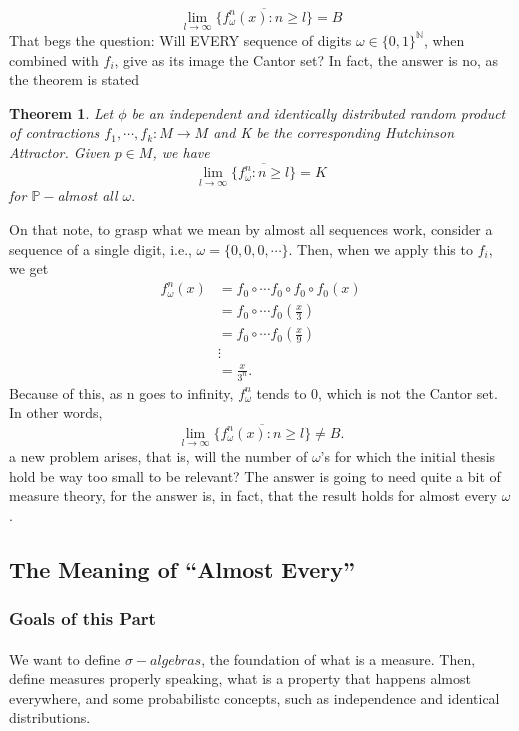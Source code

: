 \documentclass{article}
\newtheorem*{theo*}{Theorem}
\begin{document}
  $$
  \lim_{l\to\infty}\overline{\{f_{\omega}^{n}(x):n\geq{l}\}} = B
  $$
  That begs the question: Will EVERY sequence of digits $\omega\in\{0, 1\}^{\mathbb{N}}$, when combined with $f_{i}$, give 
as its image the Cantor set? In fact, the answer is no, as the theorem is stated
 \begin{theo*}
   Let $\phi$ be an independent and identically distributed random product of contractions $f_{1},\cdots, f_{k}:M\rightarrow M$ and
  K be the corresponding Hutchinson Attractor. Given $p\in M$, we have
    $$
    \lim_{l\to\infty}\overline{\{f_{\omega}^{n}:n\geq{l}\}} = K
    $$
    for $\mathbb{P}-$almost all $\omega.$
 \end{theo*}
On that note, to grasp what we mean by almost all sequences work, consider a sequence of a single digit, i.e., $\omega =\{0, 0, 0, \cdots\} $. Then, when we apply this to $f_{i}$, we get
  \begin{align*}
    f_{\omega}^{n}(x) &= f_{0}\circ{\cdots}f_{0}\circ{f_{0}}\circ{f_{0}}(x)\\
                      &= f_{0}\circ{\cdots}f_{0}(\frac{x}{3}) \\
                      &= f_{0}\circ{\cdots}f_{0}(\frac{x}{9}) \\
                      &\vdots\\
                      &= \frac{x}{3^{n}}.
  \end{align*}
  Because of this, as n goes to infinity, $f_{\omega}^{n}$ tends to 0, which is not the Cantor set. In other words,
  $$
    \lim_{l\to\infty}\overline{\{f_{\omega}^{n}(x):n\geq{l}\}}\neq B.
  $$
  a new problem arises, that is, will the number of $\omega$'s for which the initial thesis hold be way too small to be relevant? The answer is going to need
quite a bit of measure theory, for the answer is, in fact, that the result holds for almost every $\omega$.

\subsection{The Meaning of ``Almost Every''}
  \subsubsection{Goals of this Part}
  \paragraph{} We want to define $\sigma-algebras$, the foundation of what is a measure. Then, define measures properly speaking, what is a property that
happens almost everywhere, and some probabilistc concepts, such as independence and identical distributions.
\end{document}
